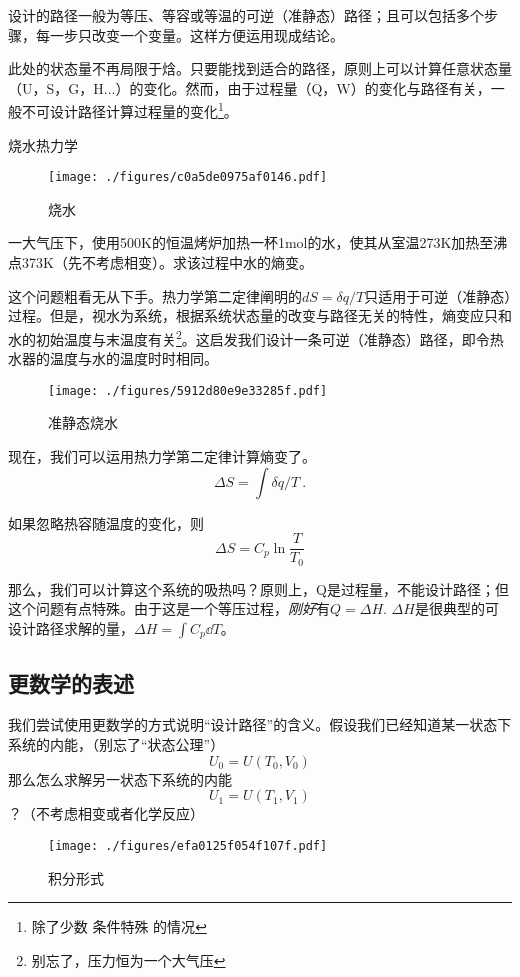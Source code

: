 设计的路径一般为等压、等容或等温的可逆（准静态）路径；且可以包括多个步骤，每一步只改变一个变量。这样方便运用现成结论。

此处的状态量不再局限于焓。只要能找到适合的路径，原则上可以计算任意状态量（U，S，G，H...）的变化。然而，由于过程量（Q，W）的变化与路径有关，一般不可设计路径计算过程量的变化\footnote{除了少数 条件特殊 的情况}。

\begin{example}{烧水热力学}
\begin{figure}[ht]
\centering
\texttt{[image: ./figures/c0a5de0975af0146.pdf]}
\caption{烧水} \label{fig_Hess_3}
\end{figure}
一大气压下，使用500K的恒温烤炉加热一杯1mol的水，使其从室温273K加热至沸点373K（先不考虑相变）。求该过程中水的熵变。

这个问题粗看无从下手。热力学第二定律阐明的$dS=\delta q/T$只适用于可逆（准静态）过程。但是，视水为系统，根据系统状态量的改变与路径无关的特性，熵变应只和水的初始温度与末温度有关\footnote{别忘了，压力恒为一个大气压}。这启发我们设计一条可逆（准静态）路径，即令热水器的温度与水的温度时时相同。

\begin{figure}[ht]
\centering
\texttt{[image: ./figures/5912d80e9e33285f.pdf]}
\caption{准静态烧水} \label{fig_Hess_4}
\end{figure}
现在，我们可以运用热力学第二定律计算熵变了。
$$\Delta S=\int \delta q/T~.$$

如果忽略热容随温度的变化，则 
$$\Delta S=C_p \ln \frac{T}{T_0}$$

那么，我们可以计算这个系统的吸热吗？原则上，Q是过程量，不能设计路径；但这个问题有点特殊。由于这是一个等压过程，\textsl{刚好}有$Q=\Delta H$. $\Delta H$是很典型的可设计路径求解的量，$\Delta H = \int C_p \dd T$。
\end{example}

\subsection{更数学的表述}
我们尝试使用更数学的方式说明“设计路径”的含义。假设我们已经知道某一状态下系统的内能，（别忘了“状态公理”）
$$U_0=U(T_0,V_0)$$
那么怎么求解另一状态下系统的内能
$$U_1=U(T_1,V_1)$$
？（不考虑相变或者化学反应）

\begin{figure}[ht]
\centering
\texttt{[image: ./figures/efa0125f054f107f.pdf]}
\caption{积分形式} \label{fig_Hess_5}
\end{figure}

